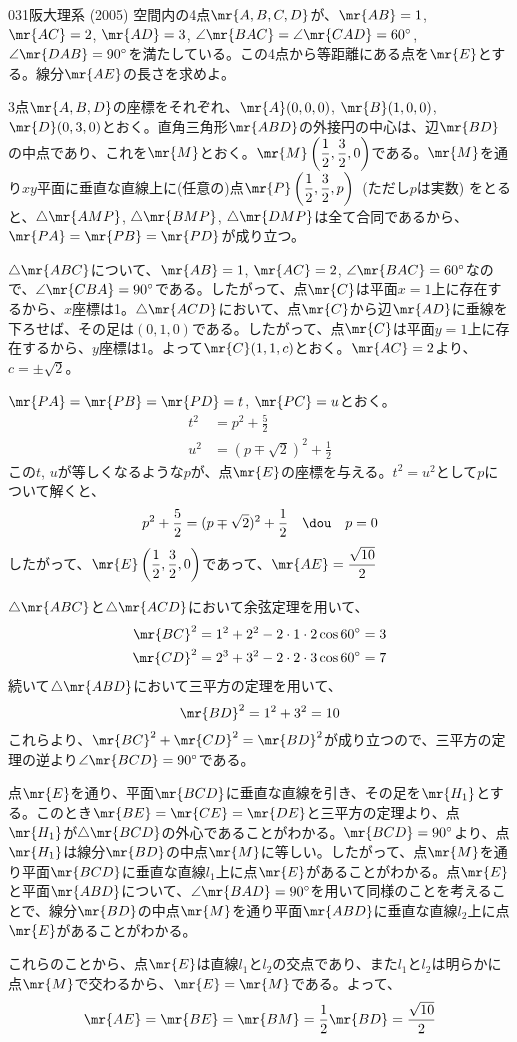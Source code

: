 \begin{thm}{031}{}{阪大理系 (2005)}
 空間内の4点$\mr{A, B, C, D}$が、$\mr{AB}=1$, $\mr{AC}=2$, $\mr{AD}=3$, $\angle\mr{BAC}=\angle\mr{CAD}=60^\circ$, $\angle\mr{DAB}=90^\circ$を満たしている。この4点から等距離にある点を$\mr{E}$とする。線分$\mr{AE}$の長さを求めよ。
\end{thm}

3点$\mr{A, B, D}$の座標をそれぞれ、$\mr{A}(0, 0, 0)$, $\mr{B}(1, 0, 0)$, $\mr{D}(0, 3, 0)$とおく。直角三角形$\mr{ABD}$の外接円の中心は、辺$\mr{BD}$の中点であり、これを$\mr{M}$とおく。$\mr{M}\left(\dfrac{1}{2}, \dfrac{3}{2}, 0\right)$である。$\mr{M}$を通り$xy$平面に垂直な直線上に(任意の)点$\mr{P}\left(\dfrac{1}{2}, \dfrac{3}{2}, p\right)$~(ただし$p$は実数) をとると、$\triangle\mr{AMP}$, $\triangle
\mr{BMP}$, $\triangle\mr{DMP}$は全て合同であるから、$\mr{PA}=\mr{PB}=\mr{PD}$が成り立つ。

$\triangle\mr{ABC}$について、$\mr{AB}=1$, $\mr{AC}=2$, $\angle\mr{BAC}=60^\circ$なので、$\angle\mr{CBA}=90^\circ$である。したがって、点$\mr{C}$は平面$x=1$上に存在するから、$x$座標は1。$\triangle\mr{ACD}$において、点$\mr{C}$から辺$\mr{AD}$に垂線を下ろせば、その足は$(0, 1, 0)$である。したがって、点$\mr{C}$は平面$y=1$上に存在するから、$y$座標は1。よって$\mr{C}(1, 1, c)$とおく。$\mr{AC}=2$より、$c=\pm\sqrt{2}$。

$\mr{PA}=\mr{PB}=\mr{PD}=t$, $\mr{PC}=u$とおく。
\begin{align*}
 t^2&=p^2+\frac{5}{2} \\
 u^2&=(p\mp\sqrt{2})^2+\frac{1}{2}
\end{align*}
この$t$, $u$が等しくなるような$p$が、点$\mr{E}$の座標を与える。$t^2=u^2$として$p$について解くと、
\[ p^2+\frac{5}{2}=(p\mp\sqrt{2})^2+\frac{1}{2} \quad\dou\quad p=0 \]
したがって、$\mr{E}\left(\dfrac{1}{2}, \dfrac{3}{2}, 0\right)$であって、$\mr{AE}=\dfrac{\sqrt{10}}{2}$

$\triangle\mr{ABC}$と$\triangle\mr{ACD}$において余弦定理を用いて、
\begin{align*}
 \mr{BC}^2&=1^2+2^2-2\cdot 1\cdot 2\cos 60^\circ=3 \\
 \mr{CD}^2&=2^3+3^2-2\cdot 2\cdot 3\cos 60^\circ=7
\end{align*}
続いて$\triangle\mr{ABD}$において三平方の定理を用いて、
\[ \mr{BD}^2=1^2+3^2=10 \]
これらより、$\mr{BC}^2+\mr{CD}^2=\mr{BD}^2$が成り立つので、三平方の定理の逆より$\angle\mr{BCD}=90^\circ$である。

点$\mr{E}$を通り、平面$\mr{BCD}$に垂直な直線を引き、その足を$\mr{H_1}$とする。このとき$\mr{BE}=\mr{CE}=\mr{DE}$と三平方の定理より、点$\mr{H_1}$が$\triangle\mr{BCD}$の外心であることがわかる。$\mr{BCD}=90^\circ$より、点$\mr{H_1}$は線分$\mr{BD}$の中点$\mr{M}$に等しい。したがって、点$\mr{M}$を通り平面$\mr{BCD}$に垂直な直線$l_1$上に点$\mr{E}$があることがわかる。点$\mr{E}$と平面$\mr{ABD}$について、$\angle\mr{BAD}=90^\circ$を用いて同様のことを考えることで、線分$\mr{BD}$の中点$\mr{M}$を通り平面$\mr{ABD}$に垂直な直線$l_2$上に点$\mr{E}$があることがわかる。

これらのことから、点$\mr{E}$は直線$l_1$と$l_2$の交点であり、また$l_1$と$l_2$は明らかに点$\mr{M}$で交わるから、$\mr{E}=\mr{M}$である。よって、
\[ \mr{AE}=\mr{BE}=\mr{BM}=\frac{1}{2}\mr{BD}=\frac{\sqrt{10}}{2} \]